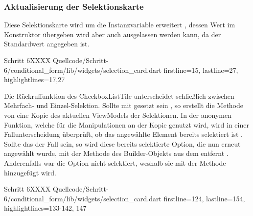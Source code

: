 \subsubsection{Aktualisierung der Selektionskarte}


Diese Selektionskarte wird um die Instanzvariable  erweitert ,
dessen Wert im Konstruktor übergeben wird  aber auch ausgelassen werden kann, da der Standardwert  angegeben ist.

\begin{alexlisting}{Schritt 6}{XXXX}
  {Quellcode/Schritt-6/conditional_form/lib/widgets/selection_card.dart}
  {firstline=15, lastline=27, highlightlines={17,27}}
  \label{lst:Schritt6SelectionCard}
\end{alexlisting}


Die Rückruffunktion  des CheckboxListTile unterscheidet schließlich zwischen Mehrfach- und Einzel-Selektion.
Sollte  mit  gesetzt sein , so erstellt die Methode  von  eine Kopie des aktuellen ViewModels der Selektionen.
In der anonymen Funktion,
welche für die Manipulationen an der Kopie genutzt wird,
wird in einer Fallunterscheidung überprüft,
ob das angewählte Element bereits selektiert ist .
Sollte das der Fall sein,
so wird diese bereits selektierte Option, die nun erneut angewählt wurde, mit der Methode  des Builder-Objekts aus dem  entfernt .
Anderenfalls war die Option nicht selektiert, weshalb sie mit der Methode  hinzugefügt wird. 


\begin{alexlisting}{Schritt 6}{XXXX}
  {Quellcode/Schritt-6/conditional_form/lib/widgets/selection_card.dart}
  {firstline=124, lastline=154, highlightlines={133-142, 147}}
  \label{lst:Schritt6XXXX}
\end{alexlisting}

\ifincludeall \clearpage \fi
